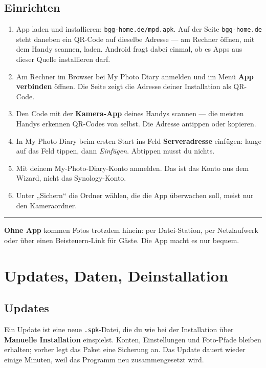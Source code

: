 \documentclass[11pt,a4paper]{article}
\let\mpdtt\texttt
\renewcommand{\texttt}[1]{\mpdtt{\textcolor{mpdred}{#1}}}
\newcommand{\tipp}[1]{%
  \par\vspace{4pt}\noindent
  \colorbox{tipbg}{\parbox{\dimexpr\linewidth-2\fboxsep}{%
    {\color{mpdgold}\rule[-3pt]{2pt}{1.1em}}\hspace{6pt}\parbox[t]{\dimexpr\linewidth-2\fboxsep-12pt}{#1}}}%
  \par\vspace{4pt}}
\begin{document}
\subsection{Einrichten}
\begin{enumerate}[leftmargin=*, itemsep=2pt]
  \item App laden und installieren: \texttt{bgg-home.de/mpd.apk}. Auf der Seite
    \texttt{bgg-home.de} steht daneben ein QR-Code auf dieselbe Adresse ---
    am Rechner öffnen, mit dem Handy scannen, laden. Android fragt dabei
    einmal, ob es Apps aus dieser Quelle installieren darf.
  \item Am Rechner im Browser bei My Photo Diary anmelden und im Menü
    \textbf{App verbinden} öffnen. Die Seite zeigt die Adresse deiner
    Installation als QR-Code.
  \item Den Code mit der \textbf{Kamera-App} deines Handys scannen --- die
    meisten Handys erkennen QR-Codes von selbst. Die Adresse antippen oder
    kopieren.
  \item In My Photo Diary beim ersten Start ins Feld \textbf{Serveradresse}
    einfügen: lange auf das Feld tippen, dann \emph{Einfügen}. Abtippen musst
    du nichts.
  \item Mit deinem My-Photo-Diary-Konto anmelden. Das ist das Konto aus dem
    Wizard, nicht das Synology-Konto.
  \item Unter „Sichern“ die Ordner wählen, die die App überwachen soll, meist
    nur den Kameraordner.
\end{enumerate}

\tipp{\textbf{Ohne App} kommen Fotos trotzdem hinein: per Datei-Station, per
Netzlaufwerk oder über einen Beisteuern-Link für Gäste. Die App macht es nur
bequem.}

\section{Updates, Daten, Deinstallation}

\subsection{Updates}
Ein Update ist eine neue \texttt{.spk}-Datei, die du wie bei der Installation
über \textbf{Manuelle Installation} einspielst. Konten, Einstellungen und
Foto-Pfade bleiben erhalten; vorher legt das Paket eine Sicherung an. Das
Update dauert wieder einige Minuten, weil das Programm neu zusammengesetzt wird.
\end{document}
